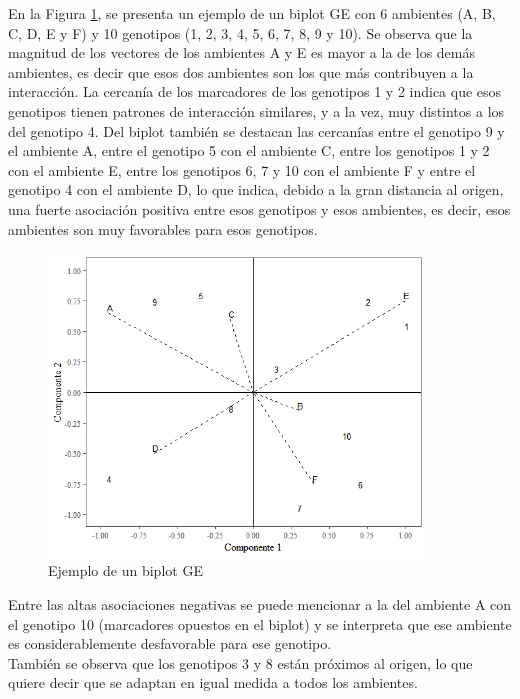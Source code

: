 En la Figura \ref{fig:fig311}, se presenta un ejemplo de un biplot GE con 6 ambientes (A, B, C, D, E y F) y 10 genotipos (1, 2, 3, 4, 5, 6, 7, 8, 9 y 10). Se observa que la magnitud de los vectores de los ambientes A y E es mayor a la de los demás ambientes, es decir que esos dos ambientes son los que más contribuyen a la interacción. La cercanía de los marcadores de los genotipos 1 y 2 indica que esos genotipos tienen patrones de interacción similares, y a la vez, muy distintos a los del genotipo 4. Del biplot también se destacan las cercanías entre el genotipo 9 y el ambiente A, entre el genotipo 5 con el ambiente C, entre los genotipos 1 y 2 con el ambiente E, entre los genotipos 6, 7 y 10 con el ambiente F y entre el genotipo 4 con el ambiente D, lo que indica, debido a la gran distancia al origen, una fuerte asociación positiva entre esos genotipos y esos ambientes, es decir, esos ambientes son muy favorables para esos genotipos.\\

\begin{figure}[h]
	\begin{center}
		\includegraphics[width=10cm]{./Graficos/GE_biplot.png}
	\end{center}
	\caption{Ejemplo de un biplot GE}
	\label{fig:fig311}
\end{figure}

Entre las altas asociaciones negativas se puede mencionar a la del ambiente A con el genotipo 10 (marcadores opuestos en el biplot) y se interpreta que ese ambiente es considerablemente desfavorable para ese genotipo.\\

También se observa que los genotipos 3 y 8 están próximos al origen, lo que quiere decir que se adaptan en igual medida a todos los ambientes.


